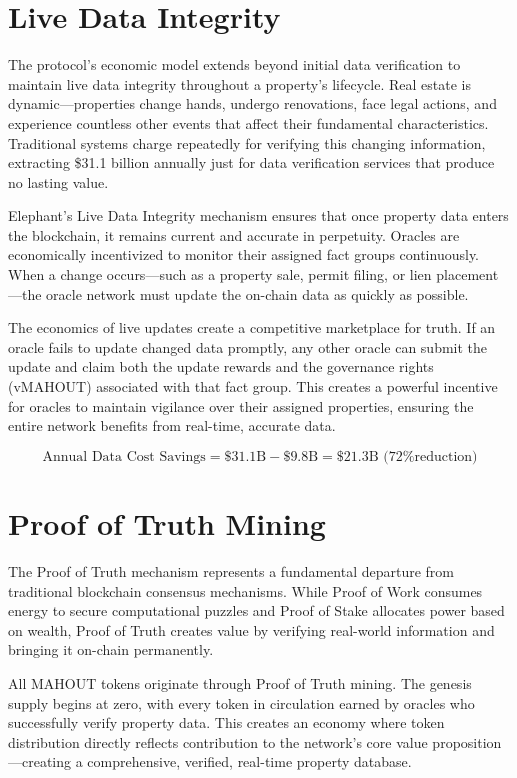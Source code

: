 \section{Live Data Integrity}

The protocol's economic model extends beyond initial data verification to maintain live data integrity throughout a property's lifecycle. Real estate is dynamic—properties change hands, undergo renovations, face legal actions, and experience countless other events that affect their fundamental characteristics. Traditional systems charge repeatedly for verifying this changing information, extracting \$31.1 billion annually just for data verification services that produce no lasting value.

Elephant's Live Data Integrity mechanism ensures that once property data enters the blockchain, it remains current and accurate in perpetuity. Oracles are economically incentivized to monitor their assigned fact groups continuously. When a change occurs—such as a property sale, permit filing, or lien placement—the oracle network must update the on-chain data as quickly as possible.

The economics of live updates create a competitive marketplace for truth. If an oracle fails to update changed data promptly, any other oracle can submit the update and claim both the update rewards and the governance rights (vMAHOUT) associated with that fact group. This creates a powerful incentive for oracles to maintain vigilance over their assigned properties, ensuring the entire network benefits from real-time, accurate data.

\[
\text{Annual Data Cost Savings} = \$31.1\text{B} - \$9.8\text{B} = \$21.3\text{B} \text{ (72\% reduction)}
\]

\section{Proof of Truth Mining}

The Proof of Truth mechanism represents a fundamental departure from traditional blockchain consensus mechanisms. While Proof of Work consumes energy to secure computational puzzles and Proof of Stake allocates power based on wealth, Proof of Truth creates value by verifying real-world information and bringing it on-chain permanently.

All MAHOUT tokens originate through Proof of Truth mining. The genesis supply begins at zero, with every token in circulation earned by oracles who successfully verify property data. This creates an economy where token distribution directly reflects contribution to the network's core value proposition—creating a comprehensive, verified, real-time property database.

